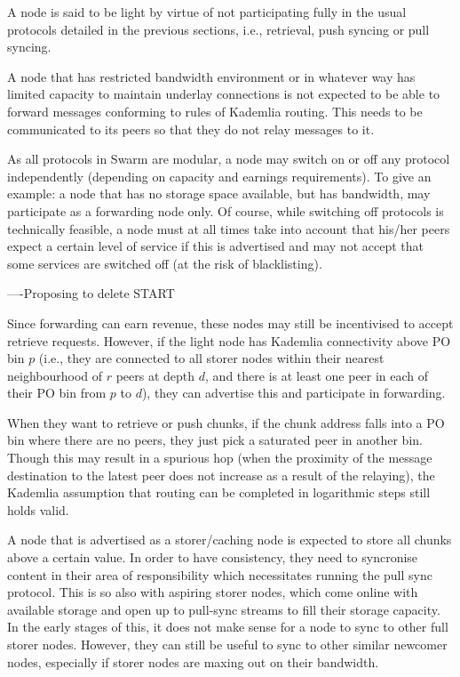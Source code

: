 A node is said to be light by virtue of not participating fully in the usual protocols detailed in the previous sections, i.e., retrieval, push syncing or pull syncing. 

A node that has restricted bandwidth environment or in whatever way has limited capacity  to maintain underlay connections is not expected to be able to forward messages conforming to rules of Kademlia routing. This needs to be communicated to its peers so that they do not relay messages to it. 

As all protocols in Swarm are modular, a node may switch on or off any protocol independently (depending on capacity and earnings requirements). To give an example: a node that has no storage space available, but has bandwidth, may participate as a forwarding node only. Of course, while switching off protocols is technically feasible, a node must at all times take into account that his/her peers expect a certain level of service if this is advertised and may not accept that some services are switched off (at the risk of blacklisting). 

----Proposing to delete START

Since forwarding can earn revenue, these nodes may still be incentivised to accept retrieve requests. However, if the light node has Kademlia connectivity above PO bin $p$ (i.e., they  are connected to all storer nodes within their nearest neighbourhood of $r$ peers at depth   $d$, and there is at least one peer in each of their PO bin from $p$ to $d$), they can advertise this and participate in forwarding. 

When they want to retrieve or push chunks, if the chunk address falls into a PO bin where there are no peers, they just pick a saturated peer in another bin. Though this may result in a spurious hop (when the proximity of the message  destination to the latest peer does not increase as a result of the relaying), the Kademlia assumption that routing can be completed in logarithmic steps still holds valid.

A node that is advertised as a storer/caching node is expected to store all chunks  above a certain value. In order to have consistency, they need to syncronise content in their area of responsibility which necessitates running the pull sync protocol. This is so also with aspiring storer nodes, which come online with available storage and open up to pull-sync streams to fill their storage capacity. In the early stages of this, it does not make sense for a node to sync to other full storer nodes. However, they can still be useful to sync to other similar newcomer nodes, especially if storer nodes are maxing out on their bandwidth.

